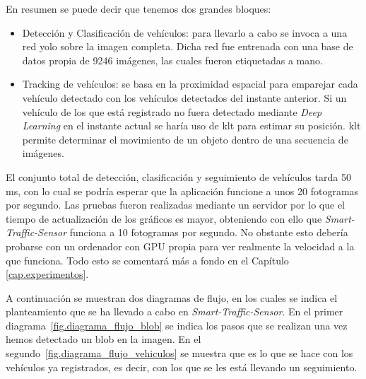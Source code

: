 En resumen se puede decir que tenemos dos grandes bloques:
\begin{itemize}
    \item Detección y Clasificación de vehículos: para llevarlo a cabo se invoca a una red \acrshort{yolo} sobre la imagen completa. Dicha red fue entrenada con una base de datos propia de 9246 imágenes, las cuales fueron etiquetadas a mano.   
    \item Tracking de vehículos: se basa en la proximidad espacial para emparejar cada vehículo detectado con los vehículos detectados del instante anterior. Si un vehículo de los que está registrado no fuera detectado mediante \textit{Deep Learning} en el instante actual se haría uso de \acrshort{klt} para estimar su posición. \acrshort{klt} permite determinar el movimiento de un objeto dentro de una secuencia de imágenes.
\end{itemize}

El conjunto total de detección, clasificación y seguimiento de vehículos tarda 50 ms, con lo cual se podría esperar que la aplicación funcione a unos 20 fotogramas por segundo. Las pruebas fueron realizadas mediante un servidor por lo que el tiempo de actualización de los gráficos es mayor, obteniendo con ello que \textit{Smart-Traffic-Sensor} funciona a 10 fotogramas por segundo. No obstante esto debería probarse con un ordenador con GPU propia para ver realmente la velocidad a la que funciona. Todo esto se comentará más a fondo en el Capítulo \ref{cap.experimentos}.

A continuación se muestran dos diagramas de flujo, en los cuales se indica el planteamiento que se ha llevado a cabo en \textit{Smart-Traffic-Sensor}. En el primer diagrama~\ref{fig.diagrama_flujo_blob} se indica los pasos que se realizan una vez hemos detectado un blob en la imagen. En el segundo~\ref{fig.diagrama_flujo_vehiculos} se muestra que es lo que se hace con los vehículos ya registrados, es decir, con los que se les está llevando un seguimiento.

